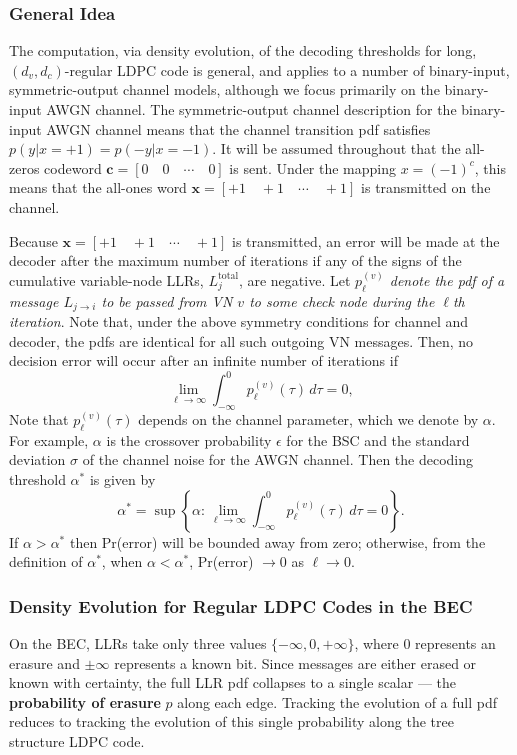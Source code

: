 \documentclass[11pt]{article}
\begin{document}
\subsubsection{General Idea}
The computation, via density evolution, of the decoding thresholds for long, $(d_v,d_c)$-regular LDPC code is general, and applies to a number of binary-input, symmetric-output channel models, although we focus primarily on the binary-input AWGN channel. The symmetric-output channel description for the binary-input AWGN channel means that the channel transition pdf satisfies $p(y|x=+1)=p(-y|x=-1)$. It will be assumed throughout that the all-zeros codeword $\mathbf{c}=[0\quad 0\quad \cdots\quad 0]$ is sent. Under the mapping $x=(-1)^c$, this means that the all-ones word $\mathbf{x}=[+1\quad +1\quad \cdots\quad +1]$ is transmitted on the channel.

Because $\mathbf{x}=[+1\quad +1\quad \cdots\quad +1]$ is transmitted, an error will be made at the decoder after the maximum number of iterations if any of the signs of the cumulative variable-node LLRs, $L_j^{\text{total}}$, are negative. Let \textit{$p_{\ell}^{(v)}$ denote the pdf of a message $L_{j \to i}$ to be passed from VN $v$ to some check node during the $\ell$th iteration}. Note that, under the above symmetry conditions for channel and decoder, the pdfs are identical for all such outgoing VN messages. Then, no decision error will occur after an infinite number of iterations if
\[
\lim_{\ell \to \infty} \int_{-\infty}^{0} p_{\ell}^{(v)}(\tau)\,d\tau = 0,
\]
Note that $p_{\ell}^{(v)}(\tau)$ depends on the channel parameter, which we denote by $\alpha$. For example, $\alpha$ is the crossover probability $\epsilon$ for the BSC and the standard deviation $\sigma$ of the channel noise for the AWGN channel. Then the decoding threshold $\alpha^*$ is given by
\[
\alpha^* = \sup\left\{\alpha : \lim_{\ell \to \infty} \int_{-\infty}^{0} p_{\ell}^{(v)}(\tau)\,d\tau = 0\right\}.
\]
If $\alpha > \alpha^*$ then Pr(error) will be bounded away from zero; otherwise, from the definition of $\alpha^*$, when $\alpha < \alpha^*$, Pr(error) $\to 0$ as $\ell \to 0$.

\subsubsection{Density Evolution for Regular LDPC Codes in the BEC}

On the BEC, LLRs take only three values $\{-\infty, 0, +\infty\}$, where $0$ represents an erasure and $\pm\infty$ represents a known bit. Since messages are either erased or known with certainty, the full LLR pdf collapses to a single scalar --- the \textbf{probability of erasure} $p$ along each edge. Tracking the evolution of a full pdf reduces to tracking the evolution of this single probability along the tree structure LDPC code.
\end{document}
